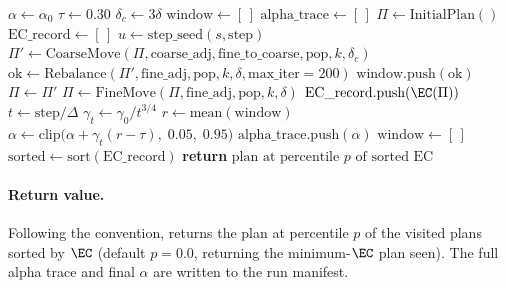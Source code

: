 \begin{algorithm}[t]
\caption{\ams{}($\text{fine\_adj}$, $\text{coarse\_adj}$,
  $\text{fine\_to\_coarse}$, $\text{pop}$, $k$, $\delta$,
  $\tau$, $\alpha_0$, $\Delta$, $\gamma_0$, $T$, $s$, $p$)}
\label{alg:ams}
\begin{algorithmic}[1]
\State $\alpha \gets \alpha_0$ 
\State $\tau \gets 0.30$ 
\State $\delta_c \gets 3\delta$ 
\State $\mathrm{window} \gets [\,]$ 
\State $\mathrm{alpha\_trace} \gets [\,]$
\State $\Pi \gets \text{InitialPlan}()$
\State $\mathrm{EC\_record} \gets [\,]$ 
  \State $u \gets \text{step\_seed}(s, \text{step})$
    \State $\Pi' \gets \text{CoarseMove}(\Pi, \text{coarse\_adj}, \text{fine\_to\_coarse},
           \text{pop}, k, \delta_c)$
    \State $\text{ok} \gets \text{Rebalance}(\Pi', \text{fine\_adj}, \text{pop}, k, \delta,
           \text{max\_iter}=200)$
    \State $\mathrm{window}.\text{push}(\text{ok})$
      \State $\Pi \gets \Pi'$
    \EndIf
  \Else
    \State $\Pi \gets \text{FineMove}(\Pi, \text{fine\_adj}, \text{pop}, k, \delta)$
  \EndIf
  \State $\mathrm{EC\_record}.\text{push}(\EC(\Pi))$
    \State $t \gets \text{step} / \Delta$
    \State $\gamma_t \gets \gamma_0 / t^{3/4}$
    \State $r \gets \text{mean}(\mathrm{window})$
    \State $\alpha \gets \text{clip}\!\bigl(\alpha + \gamma_t(r - \tau),\; 0.05,\; 0.95\bigr)$
    \State $\mathrm{alpha\_trace}.\text{push}(\alpha)$
    \State $\mathrm{window} \gets [\,]$
  \EndIf
\EndFor
\State $\text{sorted} \gets \text{sort}(\mathrm{EC\_record})$
\State \textbf{return} $\text{plan at percentile } p \text{ of sorted EC}$
\end{algorithmic}
\end{algorithm}

\paragraph{Return value.}
Following the \ms{} convention, \ams{} returns the plan at percentile $p$ of
the visited plans sorted by $\EC$ (default $p = 0.0$, returning the
minimum-$\EC$ plan seen).
The full alpha trace and final $\alpha$ are written to the run manifest.

